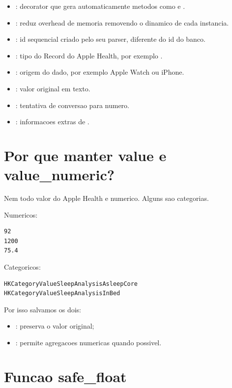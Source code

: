 \begin{itemize}
  \item {}: decorator que gera automaticamente metodos como  e .
  \item {}: reduz overhead de memoria removendo o  dinamico de cada instancia.
  \item {}: id sequencial criado pelo seu parser, diferente do id do banco.
  \item {}: tipo do Record do Apple Health, por exemplo .
  \item {}: origem do dado, por exemplo Apple Watch ou iPhone.
  \item {}: valor original em texto.
  \item {}: tentativa de conversao para numero.
  \item {}: informacoes extras de .
\end{itemize}

\section{Por que manter value e value\_numeric?}

Nem todo valor do Apple Health e numerico. Alguns sao categorias.

Numericos:

\begin{verbatim}
92
1200
75.4
\end{verbatim}

Categoricos:

\begin{verbatim}
HKCategoryValueSleepAnalysisAsleepCore
HKCategoryValueSleepAnalysisInBed
\end{verbatim}

Por isso salvamos os dois:

\begin{itemize}
  \item {}: preserva o valor original;
  \item {}: permite agregacoes numericas quando possivel.
\end{itemize}

\section{Funcao safe\_float}

